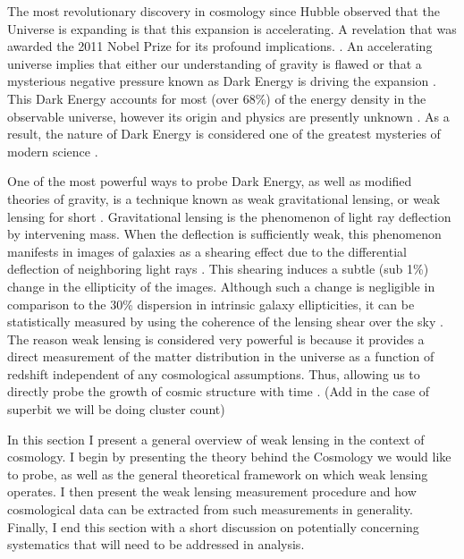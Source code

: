 The most revolutionary discovery in cosmology since 
Hubble observed that the Universe is expanding is that 
this expansion is accelerating. A revelation that was 
awarded the 2011 Nobel Prize for its profound 
implications. \cite{nobel}. An accelerating
universe implies that either our understanding of gravity is flawed 
or that a mysterious negative pressure known as Dark Energy is driving the 
expansion \cite{peebles}.
This Dark Energy accounts for most (over 68\%) of the energy density in the observable universe, 
however its origin and physics are presently unknown \cite{planck}. 
As a result, the nature of Dark Energy is considered one of the 
greatest mysteries of modern science \cite{pathfinder}.  
\par
One of the most powerful ways to probe Dark Energy, as well as modified theories of gravity, is a technique known as weak gravitational lensing, or weak lensing for short \cite{hoekstra,rachel_2018}. Gravitational lensing is the phenomenon of light ray deflection by intervening mass. When the deflection is sufficiently weak, this phenomenon manifests in images of galaxies as a shearing effect due to the differential deflection of neighboring light rays \cite{general_2013,hoekstra}. This shearing induces a subtle (sub 1\%) change in the ellipticity of the images. Although such a change is negligible in comparison to the 30\% dispersion in intrinsic galaxy ellipticities, it can be statistically measured by using the coherence of the lensing shear over the sky \cite{general_2013}. The reason weak lensing is considered very powerful is because it provides a direct measurement of the matter distribution in the universe as a function of redshift independent of any cosmological assumptions. Thus, allowing us to directly probe the growth of cosmic structure with time \cite{hoekstra}. (Add in the case of superbit we will be doing cluster count)
\par
In this section I present a general overview of weak lensing in the context of cosmology. I begin by presenting the theory behind the Cosmology we would like to probe, as well as the general theoretical framework on which weak lensing operates. I then present the weak lensing measurement procedure and how cosmological data can be extracted from such measurements in generality. Finally, I end this section with a short discussion on potentially concerning systematics that will need to be addressed in analysis.